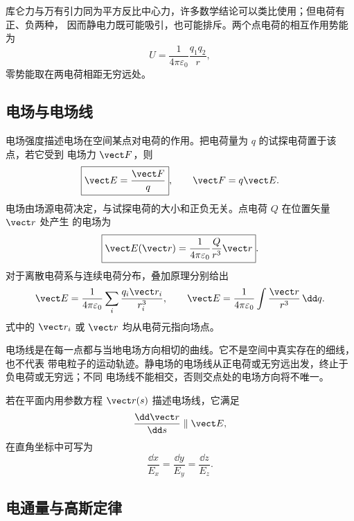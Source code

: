 \coulombHistoryContextDiagram

库仑力与万有引力同为平方反比中心力，许多数学结论可以类比使用；但电荷有正、负两种，
因而静电力既可能吸引，也可能排斥。两个点电荷的相互作用势能为
\begin{equation}
  U=\frac{1}{4\pi\varepsilon_0}\frac{q_1q_2}{r},
\end{equation}
零势能取在两电荷相距无穷远处。

\subsection*{电场与电场线}

电场强度描述电场在空间某点对电荷的作用。把电荷量为 $q$ 的试探电荷置于该点，若它受到
电场力 $\vect F$，则
\begin{equation}
  \boxed{\vect E=\frac{\vect F}{q}},
  \qquad \vect F=q\vect E.
\end{equation}
电场由场源电荷决定，与试探电荷的大小和正负无关。点电荷 $Q$ 在位置矢量 $\vect r$ 处产生
的电场为
\begin{equation}
  \boxed{\vect E(\vect r)=
  \frac{1}{4\pi\varepsilon_0}\frac{Q}{r^3}\vect r}.
\end{equation}
对于离散电荷系与连续电荷分布，叠加原理分别给出
\begin{equation}
  \vect E=\frac{1}{4\pi\varepsilon_0}
  \sum_i\frac{q_i\vect r_i}{r_i^3},
  \qquad
  \vect E=\frac{1}{4\pi\varepsilon_0}
  \int\frac{\vect r}{r^3}\,\dd q.
\end{equation}
式中的 $\vect r_i$ 或 $\vect r$ 均从电荷元指向场点。

电场线是在每一点都与当地电场方向相切的曲线。它不是空间中真实存在的细线，也不代表
带电粒子的运动轨迹。静电场的电场线从正电荷或无穷远出发，终止于负电荷或无穷远；不同
电场线不能相交，否则交点处的电场方向将不唯一。

\fieldLineDiagram

若在平面内用参数方程 $\vect r(s)$ 描述电场线，它满足
\begin{equation}
  \frac{\dd\vect r}{\dd s}\parallel\vect E,
\end{equation}
在直角坐标中可写为
\begin{equation}
  \frac{\dd x}{E_x}=\frac{\dd y}{E_y}=\frac{\dd z}{E_z}.
\end{equation}

\subsection*{电通量与高斯定律}

